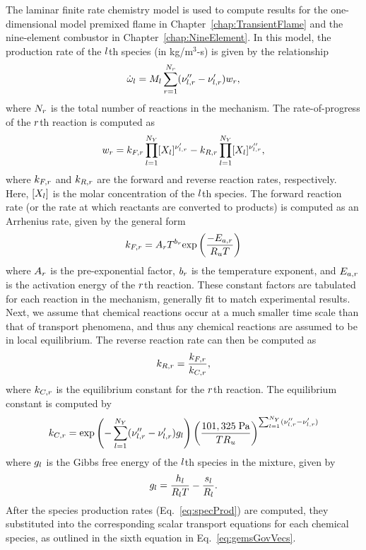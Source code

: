 The laminar finite rate chemistry model is used to compute results for the one-dimensional model premixed flame in Chapter~\ref{chap:TransientFlame} and the nine-element combustor in Chapter~\ref{chap:NineElement}. In this model, the production rate of the $l$th species (in kg/m$^3$-s) is given by the relationship
%
\begin{equation}\label{eq:specProd}
	\dot{\omega}_{l} = M_{l} \sum_{r = 1}^{N_r} (\nu_{l,r}'' - \nu_{l,r}') w_{r},
\end{equation}
%
where $N_r$ is the total number of reactions in the mechanism. The rate-of-progress of the $r$th reaction is computed as
%
\begin{equation}\label{eq:rateOfProg}
	w_{r} = k_{F,r} \prod_{l=1}^{N_Y} [X_{l}]^{\nu_{l,r}'} - k_{R,r} \prod_{l=1}^{N_Y} [X_{l}]^{\nu_{l,r}''},
\end{equation}
%
where $k_{F,r}$ and $k_{R,r}$ are the forward and reverse reaction rates, respectively. Here, $[X_{l}]$ is the molar concentration of the $l$th species. The forward reaction rate (or the rate at which reactants are converted to products) is computed as an Arrhenius rate, given by the general form
%
\begin{equation}
	k_{F,r} = A_{r} T^{b_{r}} \text{exp} \left( \frac{-E_{a,r}}{R_u T} \right)
\end{equation}
%
where $A_{r}$ is the pre-exponential factor, $b_{r}$ is the temperature exponent, and $E_{a,r}$ is the activation energy of the $r$th reaction. These constant factors are tabulated for each reaction in the mechanism, generally fit to match experimental results. Next, we assume that chemical reactions occur at a much smaller time scale than that of transport phenomena, and thus any chemical reactions are assumed to be in local equilibrium. The reverse reaction rate can then be computed as
%
\begin{equation}
	k_{R,r} = \frac{k_{F,r}}{k_{C,r}},
\end{equation}
%
where $k_{C,r}$ is the equilibrium constant for the $r$th reaction. The equilibrium constant is computed by
%
\begin{equation}
	k_{C,r} = \text{exp}\left(-\sum_{l = 1}^{N_Y} (\nu_{l,r}'' - \nu_{l,r}') g_{l}\right) \left(\frac{101,325 \; \text{Pa}}{T R_u}\right)^{\sum_{l = 1}^{N_Y} (\nu_{l,r}'' - \nu_{l,r}')}
\end{equation}
%
where $g_{l}$ is the Gibbs free energy of the $l$th species in the mixture, given by
%
\begin{equation}\label{eq:gibbsSpec}
	g_{l} = \frac{h_{l}}{R_{l} T} - \frac{s_{l}}{R_{l}}.
\end{equation}
%
After the species production rates (Eq.~\ref{eq:specProd}) are computed, they substituted into the corresponding scalar transport equations for each chemical species, as outlined in the sixth equation in Eq.~\ref{eq:gemsGovVecs}.

